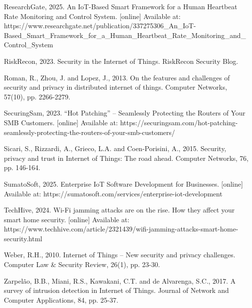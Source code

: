 ResearchGate, 2025. An IoT-Based Smart Framework for a Human Heartbeat Rate Monitoring and Control System. [online] Available at: https://www.researchgate.net/publication/337275306\_An\_IoT-Based\_Smart\_Framework\_for\_a\_Human\_Heartbeat\_Rate\_Monitoring\_and\_Control\_System

RiskRecon, 2023. Security in the Internet of Things. RiskRecon Security Blog.

Roman, R., Zhou, J. and Lopez, J., 2013. On the features and challenges of security and privacy in distributed internet of things. Computer Networks, 57(10), pp. 2266-2279.

SecuringSam, 2023. ``Hot Patching'' -- Seamlessly Protecting the Routers of Your SMB Customers. [online] Available at: https://securingsam.com/hot-patching-seamlessly-protecting-the-routers-of-your-smb-customers/

Sicari, S., Rizzardi, A., Grieco, L.A. and Coen-Porisini, A., 2015. Security, privacy and trust in Internet of Things: The road ahead. Computer Networks, 76, pp. 146-164.

SumatoSoft, 2025. Enterprise IoT Software Development for Businesses. [online] Available at: https://sumatosoft.com/services/enterprise-iot-development

TechHive, 2024. Wi-Fi jamming attacks are on the rise. How they affect your smart home security. [online] Available at: https://www.techhive.com/article/2321439/wifi-jamming-attacks-smart-home-security.html

Weber, R.H., 2010. Internet of Things -- New security and privacy challenges. Computer Law \& Security Review, 26(1), pp. 23-30.

Zarpelão, B.B., Miani, R.S., Kawakani, C.T. and de Alvarenga, S.C., 2017. A survey of intrusion detection in Internet of Things. Journal of Network and Computer Applications, 84, pp. 25-37.
